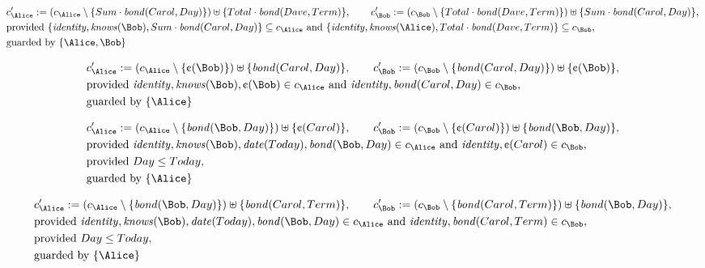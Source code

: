\begin{align*}
&
c'_
{
\Alice
}
 := 
(c_
{
\Alice
}
 \setminus 
\{
Sum
\cdot
\mathit{
bond
}
(
Carol
,
Day
)
\}
) \uplus 
\{
Total
\cdot
\mathit{
bond
}
(
Dave
,
Term
)
\}
, \qquad 
c'_
{
\Bob
}
 := 
(c_
{
\Bob
}
 \setminus 
\{
Total
\cdot
\mathit{
bond
}
(
Dave
,
Term
)
\}
) \uplus 
\{
Sum
\cdot
\mathit{
bond
}
(
Carol
,
Day
)
\}
,\\
&
\text{provided } 
\{
\mathit{
identity
}
,
\mathit{
knows
}
(
\Bob
)
,
Sum
\cdot
\mathit{
bond
}
(
Carol
,
Day
)
\}
 \subseteq c_
{
\Alice
}
 \text{ and } 
\{
\mathit{
identity
}
,
\mathit{
knows
}
(
\Alice
)
,
Total
\cdot
\mathit{
bond
}
(
Dave
,
Term
)
\}
 \subseteq c_
{
\Bob
}
,\\
&
\text{guarded by } \{
\Alice
,
\Bob
\}
\end{align*}

\begin{align*}
&
c'_
{
\Alice
}
 := 
(c_
{
\Alice
}
 \setminus 
\{
\text{\textcent}
(
\Bob
)
\}
) \uplus 
\{
\mathit{
bond
}
(
Carol
,
Day
)
\}
, \qquad 
c'_
{
\Bob
}
 := 
(c_
{
\Bob
}
 \setminus 
\{
\mathit{
bond
}
(
Carol
,
Day
)
\}
) \uplus 
\{
\text{\textcent}
(
\Bob
)
\}
,\\
&
\text{provided } 
\mathit{
identity
}
,
\mathit{
knows
}
(
\Bob
)
,
\text{\textcent}
(
\Bob
)
 \in c_
{
\Alice
}
 \text{ and } 
\mathit{
identity
}
,
\mathit{
bond
}
(
Carol
,
Day
)
 \in c_
{
\Bob
}
,\\
&
\text{guarded by } \{
\Alice
\}
\end{align*}

\begin{align*}
&
c'_
{
\Alice
}
 := 
(c_
{
\Alice
}
 \setminus 
\{
\mathit{
bond
}
(
\Bob
,
Day
)
\}
) \uplus 
\{
\text{\textcent}
(
Carol
)
\}
, \qquad 
c'_
{
\Bob
}
 := 
(c_
{
\Bob
}
 \setminus 
\{
\text{\textcent}
(
Carol
)
\}
) \uplus 
\{
\mathit{
bond
}
(
\Bob
,
Day
)
\}
,\\
&
\text{provided } 
\mathit{
identity
}
,
\mathit{
knows
}
(
\Bob
)
,
\mathit{
date
}
(
Today
)
,
\mathit{
bond
}
(
\Bob
,
Day
)
 \in c_
{
\Alice
}
 \text{ and } 
\mathit{
identity
}
,
\text{\textcent}
(
Carol
)
 \in c_
{
\Bob
}
,\\
&
\text{provided } 
Day
\le
Today
,\\
&
\text{guarded by } \{
\Alice
\}
\end{align*}

\begin{align*}
&
c'_
{
\Alice
}
 := 
(c_
{
\Alice
}
 \setminus 
\{
\mathit{
bond
}
(
\Bob
,
Day
)
\}
) \uplus 
\{
\mathit{
bond
}
(
Carol
,
Term
)
\}
, \qquad 
c'_
{
\Bob
}
 := 
(c_
{
\Bob
}
 \setminus 
\{
\mathit{
bond
}
(
Carol
,
Term
)
\}
) \uplus 
\{
\mathit{
bond
}
(
\Bob
,
Day
)
\}
,\\
&
\text{provided } 
\mathit{
identity
}
,
\mathit{
knows
}
(
\Bob
)
,
\mathit{
date
}
(
Today
)
,
\mathit{
bond
}
(
\Bob
,
Day
)
 \in c_
{
\Alice
}
 \text{ and } 
\mathit{
identity
}
,
\mathit{
bond
}
(
Carol
,
Term
)
 \in c_
{
\Bob
}
,\\
&
\text{provided } 
Day
\le
Today
,\\
&
\text{guarded by } \{
\Alice
\}
\end{align*}
